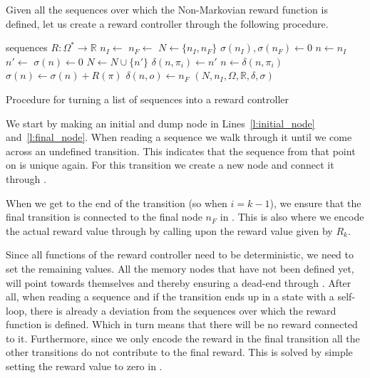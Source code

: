 Given all the sequences over which the Non-Markovian reward function is defined, let us create a reward controller through the following procedure.
\begin{algorithm}[H]
	\begin{algorithmic}[1]
		\Require sequences
		\Require $R : \Omega^* \to \mathbb{R}$
		\State $n_I \gets $   \label{l:initial_node}
		\State $n_F \gets $    \label{l:dump_node}
		\State $N\gets\{n_I,n_F\}$
		\State $\sigma(n_I),\sigma(n_F)\gets 0$ 
			\State $n \gets n_I$
					\State $n'\gets$  
					\State $\sigma(n) \gets 0$
					\State $N \gets N \cup \{n'\}$		
					\State $\delta(n,\pi_i) \gets n'$	\label{l:set_transition}
				\EndIf 
				\State $n \gets \delta(n,\pi_i)$     
			\EndFor
			\State $\sigma(n) \gets \sigma(n) + R(\pi)$  \label{l:set_reward}
		\EndFor
		 
				 
					\State $\delta(n,o) \gets n_F$ \label{l:self_loop}
				\EndIf
			\EndFor
		\EndFor
		\State \Return $(N,n_I,\Omega,\mathbb{R},\delta,\sigma)$
		\EndProcedure
	\end{algorithmic}
	\caption{Procedure for turning a list of sequences into a reward controller}
	\label{procedure:into_reward_controller}
\end{algorithm}

We start by making an initial and dump node in Lines~\ref{l:initial_node} and~\ref{l:final_node}. When reading a sequence we walk through it until we come across an undefined transition. This indicates that the sequence from that point on is unique again. For this transition we create a new node and connect it through .

When we get to the end of the transition (so when $i=k-1$), we ensure that the final transition is connected to the final node $n_F$ in . This is also where we encode the actual reward value through  by calling upon the reward value given by $R_k$.

Since all functions of the reward controller need to be deterministic, we need to set the remaining values. All the memory nodes that have not been defined yet, will point towards themselves and thereby ensuring a dead-end through . After all, when reading a sequence and if the transition ends up in a state with a self-loop, there is already a deviation from the sequences over which the reward function is defined. Which in turn means that there will be no reward connected to it. Furthermore, since we only encode the reward in the final transition all the other transitions do not contribute to the final reward. This is solved by simple setting the reward value to zero in .


